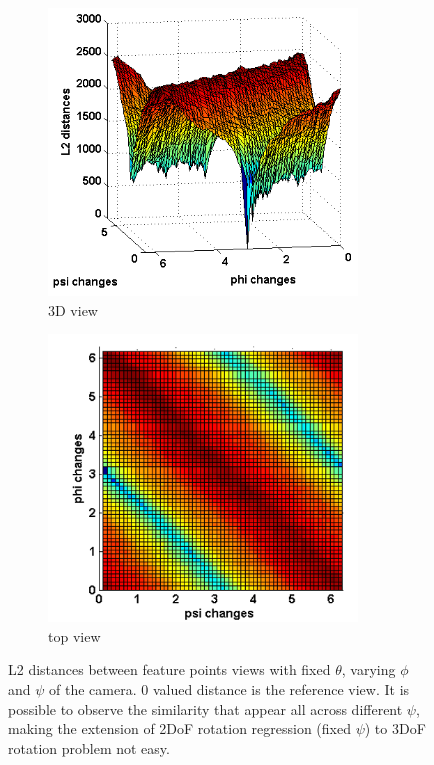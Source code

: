 \documentclass[annual]{acmsiggraph}
\begin{document}
\begin{figure}[h]
\center
\begin{subfigure}{0.5\columnwidth} \center \includegraphics[width=0.9\textwidth]{images/L2dists_psi_phi_changes_30_img.png} 
\caption{3D view} 
\label{img:diffL2:3D}
\end{subfigure}%
\begin{subfigure}{0.5\columnwidth} \center \includegraphics[width=0.9\textwidth]{images/L2dists_psi_phi_changes_30_img_top.png} 
\caption{top view}
\label{img:diffL2:top}
\end{subfigure}%
\caption{L2 distances between feature points views with fixed $\theta$, varying $\phi$ and $\psi$ of the camera. $0$ valued distance is the reference view. It is possible to observe the similarity that appear all across different $\psi$, making the extension of 2DoF rotation regression (fixed $\psi$) to 3DoF rotation problem not easy.}
\label{img:diffL2}
\end{figure}
\end{document}
